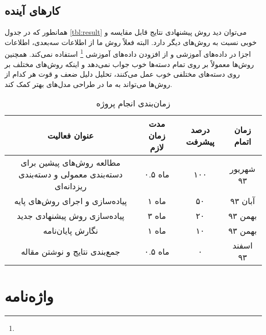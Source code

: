 \documentclass[11pt]{article}
\begin{document}
\subsection{کارهای آینده}\label{sec:future}
همانطور که در جدول
\ref{tbl:result}
می‌توان دید روش پیشنهادی نتایج قابل مقایسه و خوبی نسبت به روش‌های دیگر دارد. البته فعلاً روش ما از اطلاعات سه‌بعدی، اطلاعات اجزا در داده‌های آموزشی و از افزودن داده‌های آموزشی
\footnote{}
استفاده نمی‌کند. همچنین روش‌ها معمولاً بر روی تمام دسته‌ها خوب جواب نمی‌دهد و اینکه روش‌های مختلف بر روی دسته‌های مختلفی خوب عمل می‌کنند، تحلیل دلیل ضعف و قوت هر کدام از روش‌ها می‌تواند به ما در طراحی مدل‌های بهتر کمک کند.

\begin{table}[h]
\centering
\caption{زمان‌بندی انجام پروژه}
\label{tbl:schedule1}
\footnotesize{
\begin{tabular}{|c|c|c|c|}
\hline عنوان فعالیت & مدت زمان لازم & درصد پیشرفت & زمان اتمام \\ 
\hline \hline مطالعه روش‌های پیشین برای دسته‌بندی معمولی و دسته‌بندی ریزدانه‌ای & ۰.۵ ماه & ۱۰۰ & شهریور ۹۳ \\ 
\hline پیاده‌سازی و اجرای روش‌های پایه & ۱ ماه & ۵۰ & آبان ۹۳ \\ 
\hline پیاده‌سازی روش پیشنهادی جدید & ۳ ماه & ۲۰ & بهمن ۹۳ \\ 
\hline نگارش پایان‌نامه & ۱ ماه & ۱۰ & بهمن ۹۳ \\ 
\hline جمع‌بندی نتایج و نوشتن مقاله & ۰.۵ ماه & ۰ & اسفند ۹۳ \\ 
\hline 
\end{tabular} 
}
\end{table}

\linespread{1}
\small
\setlength{\parskip}{0pt}
\setlength{\parsep}{0pt}

\renewcommand{\bibname}{مراجع}
\begin{latin}

%

\end{latin}



\section*{واژه‌نامه}
\begin{multicols}{3}
\theendnotes 
\end{multicols}
\end{document}
